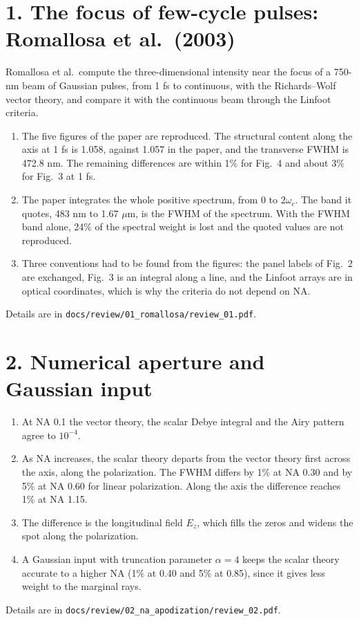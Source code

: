 \documentclass[10pt]{article}
\begin{document}
\section*{1. The focus of few-cycle pulses: Romallosa et al.\ (2003)}
Romallosa et al.\ compute the three-dimensional intensity near the focus of a 750-nm beam of Gaussian pulses, from
1 fs to continuous, with the Richards--Wolf vector theory, and compare it with the continuous beam through the
Linfoot criteria.
\begin{enumerate}
\item The five figures of the paper are reproduced. The structural content along the axis at 1 fs is 1.058, against
1.057 in the paper, and the transverse FWHM is 472.8 nm. The remaining differences are within 1\% for Fig.~4 and about
3\% for Fig.~3 at 1 fs.
\item The paper integrates the whole positive spectrum, from 0 to $2\omega_c$. The band it quotes, 483 nm to
1.67 $\mu$m, is the FWHM of the spectrum. With the FWHM band alone, 24\% of the spectral weight is lost and the
quoted values are not reproduced.
\item Three conventions had to be found from the figures: the panel labels of Fig.~2 are exchanged, Fig.~3 is an
integral along a line, and the Linfoot arrays are in optical coordinates, which is why the criteria do not depend on
NA.
\end{enumerate}
Details are in \texttt{docs/review/01\_romallosa/review\_01.pdf}.

\section*{2. Numerical aperture and Gaussian input}
\begin{enumerate}
\item At NA 0.1 the vector theory, the scalar Debye integral and the Airy pattern agree to $10^{-4}$.
\item As NA increases, the scalar theory departs from the vector theory first across the axis, along the
polarization. The FWHM differs by 1\% at NA 0.30 and by 5\% at NA 0.60 for linear polarization. Along the axis the
difference reaches 1\% at NA 1.15.
\item The difference is the longitudinal field $E_z$, which fills the zeros and widens the spot along the
polarization.
\item A Gaussian input with truncation parameter $\alpha = 4$ keeps the scalar theory accurate to a higher NA
(1\% at 0.40 and 5\% at 0.85), since it gives less weight to the marginal rays.
\end{enumerate}
Details are in \texttt{docs/review/02\_na\_apodization/review\_02.pdf}.
\end{document}
